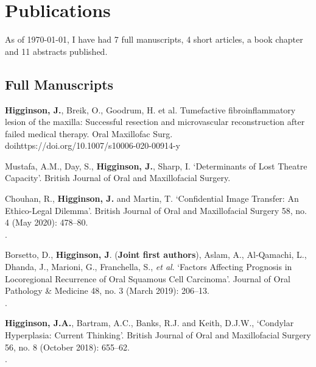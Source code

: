 \section*{Publications}
\label{publications}


As of \today, I have had 7 full manuscripts, 4 short articles, a book chapter and 11 abstracts published.

\subsection*{Full Manuscripts}

\textbf{Higginson, J.}, Breik, O., Goodrum, H. et al. Tumefactive fibroinflammatory lesion of the maxilla: Successful resection and microvascular reconstruction after failed medical therapy. Oral Maxillofac Surg. 
\\doi{https://doi.org/10.1007/s10006-020-00914-y}

\vspace{0.1cm}

 Mustafa, A.M., Day, S., \textbf{Higginson, J.}, Sharp, I. `Determinants of Lost Theatre Capacity'. British Journal of Oral and Maxillofacial Surgery.
\\

\vspace{0.1cm}

 Chouhan, R., \textbf{Higginson, J.} and Martin, T. `Confidential Image Transfer: An Ethico-Legal Dilemma’. British Journal of Oral and Maxillofacial Surgery 58, no. 4 (May 2020): 478–80. 
\\.

\vspace{0.1cm}

 Borsetto, D., \textbf{Higginson, J}. (\textbf{Joint first authors}), Aslam, A., Al‐Qamachi, L., Dhanda, J., Marioni, G., Franchella, S., \textit{et al}. `Factors Affecting Prognosis in Locoregional Recurrence of Oral Squamous Cell Carcinoma’. Journal of Oral Pathology \& Medicine 48, no. 3 (March 2019): 206–13.
\\.

\vspace{0.1cm}

 \textbf{Higginson, J.A.}, Bartram, A.C., Banks, R.J. and Keith, D.J.W., `Condylar Hyperplasia: Current Thinking’. British Journal of Oral and Maxillofacial Surgery 56, no. 8 (October 2018): 655–62. 
\\.

